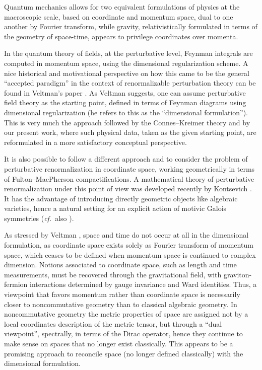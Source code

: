 \documentclass[10pt]{amsart}
\newcommand{\cf}{{\it cf.\/}\ }
\numberwithin{equation}{section}
\begin{document}
Quantum mechanics allows for two equivalent formulations of
physics at the macroscopic scale, based on coordinate and
momentum space, dual to one another by Fourier transform, while
gravity, relativistically formulated in terms of the geometry of
space-time, appears to privilege coordinates over momenta.

\smallskip

In the quantum theory of fields, at the perturbative level,
Feynman integrals are computed in momentum space, using the
dimensional regularization scheme. A nice historical and
motivational perspective on how this came to be the general
``accepted paradigm'' in the context of renormalizable
perturbation theory can be found in Veltman's paper \cite{Vel}. As
Veltman suggests, one can assume perturbative field theory as the
starting point, defined in terms of Feynman diagrams using
dimensional regularization (he refers to this as the ``dimensional
formulation''). This is very much the approach followed by the
Connes--Kreimer theory and by our present work, where such
physical data, taken as the given starting point, are reformulated
in a more satisfactory conceptual perspective.

\smallskip

It is also possible to follow a different approach and to
consider the problem of perturbative renormalization in
coordinate space, working geometrically in terms of
Fulton--MacPherson compactifications. A mathematical theory of
perturbative renormalization under this point of view was
developed recently by Kontsevich \cite{Kon}. It has the advantage
of introducing directly geometric objects like algebraic
varieties, hence a natural setting for an explicit action of
motivic Galois symmetries (\cf also \cite{Kon1}).

\smallskip

As stressed by Veltman \cite{Vel}, space and time do not occur at
all in the dimensional formulation, as coordinate space exists
solely as Fourier transform of momentum space, which ceases to be
defined when momentum space is continued to complex dimension.
Notions associated to coordinate space, such as length and time
measurements, must be recovered through the gravitational field,
with graviton-fermion interactions determined by gauge invariance
and Ward identities. Thus, a viewpoint that favors momentum rather
than coordinate space is necessarily closer to noncommutative
geometry than to classical algebraic geometry. In noncommutative
geometry the metric properties of space are assigned not by a
local coordinates description of the metric tensor, but through a
``dual viewpoint'', spectrally, in terms of the Dirac operator,
hence they continue to make sense on spaces that no longer exist
classically. This appears to be a promising approach to reconcile
space (no longer defined classically) with the dimensional
formulation.
\end{document}
